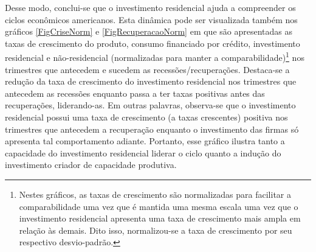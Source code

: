 


Desse modo, conclui-se que o investimento residencial ajuda a compreender os ciclos econômicos americanos.
Esta dinâmica pode ser visualizada também nos gráficos \ref{FigCriseNorm} e \ref{FigRecuperacaoNorm} em que são apresentadas as taxas de crescimento do produto, consumo financiado por crédito, investimento residencial e não-residencial (normalizadas para manter a comparabilidade)\footnote{
	Nestes gráficos, as taxas de crescimento são normalizadas para facilitar a comparabilidade uma vez que é mantida uma mesma escala uma vez que o investimento residencial apresenta uma taxa de crescimento mais ampla em relação às demais. 
	Dito isso, normalizou-se a taxa de crescimento por seu respectivo desvio-padrão.
} nos trimestres que antecedem e sucedem as recessões/recuperações. 
Destaca-se a redução da taxa de crescimento do investimento residencial nos trimestres que antecedem as recessões enquanto passa a ter taxas positivas antes das recuperações, liderando-as.
Em outras palavras, observa-se que o investimento residencial possui uma taxa de crescimento (a taxas crescentes) positiva nos trimestres que antecedem a recuperação enquanto o investimento das firmas só apresenta tal comportamento adiante. Portanto, esse gráfico ilustra tanto a capacidade do investimento residencial liderar o ciclo quanto a indução do investimento criador de capacidade produtiva.


